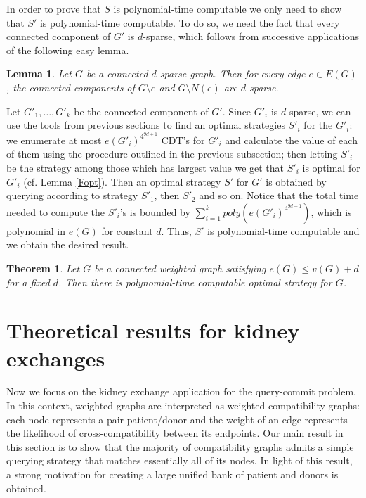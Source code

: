 \documentclass[12pt]{article}
\newtheorem{lemma}{Lemma}
\newtheorem{theo}{Theorem}
\begin{document}
	In order to prove that $S$ is polynomial-time computable we only need to show that $S'$ is polynomial-time computable. To do so, we need the fact that every connected component of $G'$ is $d$-sparse, which follows from successive applications of the following easy lemma.
	
	\begin{lemma} \label{delSparse}
		Let $G$ be a connected $d$-sparse graph. Then for every edge $e \in E(G)$, the connected components of $G \setminus e$ and $G \setminus N(e)$ are $d$-sparse.
	\end{lemma}

	Let $G'_1, \ldots, G'_k$ be the connected component of $G'$. Since $G'_i$ is $d$-sparse, we can use the tools from previous sections to find an optimal strategies $S'_i$ for the $G'_i$: we enumerate at most $e(G'_i)^{4^{9d + 1}}$ CDT's for $G'_i$ and calculate the value of each of them using the procedure outlined in the previous subsection; then letting $S'_i$ be the strategy among those which has largest value we get that $S'_i$ is optimal for $G'_i$ (cf. Lemma \ref{Fopt}). Then an optimal strategy $S'$ for $G'$ is obtained by querying according to strategy $S'_1$, then $S'_2$ and so on. Notice that the total time needed to compute the $S'_i$'s is bounded by $\sum_{i = 1}^k poly(e(G'_i)^{4^{9d + 1}})$, which is polynomial in $e(G)$ for constant $d$. Thus, $S'$ is polynomial-time computable and we obtain the desired result. 
	
		\begin{theo}		
			Let $G$ be a connected weighted graph satisfying $e(G) \le v(G) + d$ for a fixed $d$. Then there is polynomial-time computable optimal strategy for $G$.
		\end{theo}


	\section{Theoretical results for kidney exchanges} \label{theoKidney}

		Now we focus on the kidney exchange application for the query-commit problem. In this context, weighted graphs are interpreted as weighted compatibility graphs: each node represents a pair patient/donor and the weight of an edge represents the likelihood of cross-compatibility between its endpoints. Our main result in this section is to show that the majority of compatibility graphs admits a simple querying strategy that matches essentially all of its nodes. In light of this result, a strong motivation for creating a large unified bank of patient and donors is obtained.
		
\end{document}
